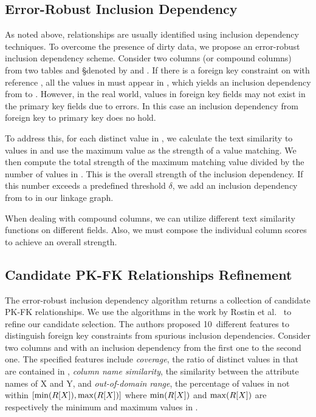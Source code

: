 \subsection{Error-Robust Inclusion Dependency}\label{subsec:eind}

As noted above, \Pkfk relationships are usually identified using inclusion
dependency techniques. To overcome the presence of dirty data, we propose an
error-robust inclusion dependency scheme.
Consider two columns (or compound columns) from two tables \R and \S denoted by
\RX and \SY. If there is a foreign key constraint on \RX with reference \SY, all
the values in \RX must appear in \SY, which yields an inclusion dependency from
\RX to \SY. However, in the real world, values in foreign key fields may not
exist in the primary key fields due to errors.  In this case an inclusion
dependency from foreign key to primary key does no hold.

To address this, for each distinct value in \RX, we calculate the
text similarity to values in \SY and use the maximum value as the strength of a
value matching. We then compute the total strength of the maximum matching value
divided by the number of values in \RX. This is the overall strength of the
inclusion dependency.  If this number exceeds a predefined threshold $\delta$,
we add an inclusion dependency from \RX to \SY in our linkage graph.

When dealing with compound columns, we can utilize different text similarity functions on different fields. 
Also, we must compose the individual column scores to achieve an overall strength.


\subsection{Candidate PK-FK Relationships Refinement}
\label{subsec:refine}


The error-robust inclusion dependency algorithm returns a collection of candidate PK-FK relationships.
We use the algorithms in the work by Rostin et al.~\cite{DBLP:conf/webdb/RostinABNL09} 
to refine our candidate selection. The authors proposed 10~different features to distinguish foreign key constraints from spurious inclusion dependencies. Consider two columns \RX and \SY with an inclusion dependency from the first one to the second one. 
The specified features include 
\emph{coverage}, the ratio of distinct values in \RX that are contained in \SY, 
\emph{column name similarity}, the similarity between the attribute names of X and Y, 
and \emph{out-of-domain range}, the percentage of values in \SY not within $[\min(R[X]), \max(R[X])]$ where $\min(R[X])$ and $\max(R[X])$ are respectively the minimum and maximum values in \RX.

